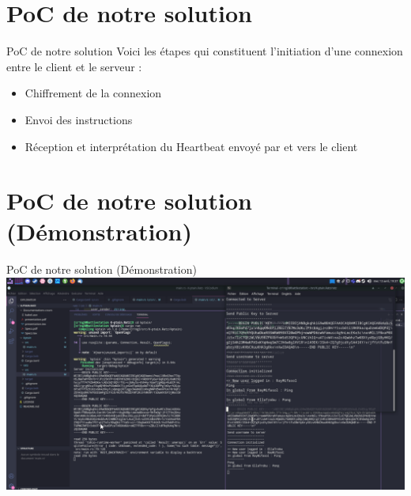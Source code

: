 \documentclass{beamer}
\begin{document}
\section{PoC de notre solution}
  \begin{frame}{PoC de notre solution}
	Voici les étapes qui constituent l'initiation d'une connexion entre le client et le serveur :
  \begin{itemize}
	\item Chiffrement de la connexion
	\item Envoi des instructions
	\item Réception et interprétation du Heartbeat envoyé par et vers le client 
  \end{itemize}
  \end{frame}

\section{PoC de notre solution (Démonstration)}
  \begin{frame}{PoC de notre solution (Démonstration)}
  \includegraphics[scale=.4]{poc.png}
  \end{frame}
\end{document}
